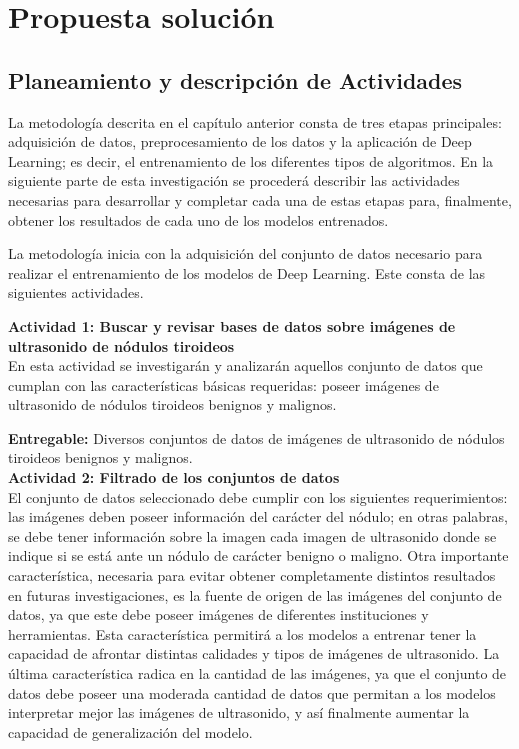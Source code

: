 \section{Propuesta solución}

\subsection{Planeamiento y descripción de Actividades}

La metodología descrita en el capítulo anterior consta de tres etapas principales: adquisición de datos, preprocesamiento de los datos y la aplicación de Deep Learning; es decir, el entrenamiento de los diferentes tipos de algoritmos. En la siguiente parte de esta investigación se procederá describir las actividades necesarias para desarrollar y completar cada una de estas etapas para, finalmente, obtener los resultados de cada uno de los modelos entrenados.

La metodología inicia con la adquisición del conjunto de datos necesario para realizar el entrenamiento de los modelos de Deep Learning. Este consta de las siguientes actividades.

\textbf{Actividad 1: Buscar y revisar bases de datos sobre imágenes de ultrasonido de nódulos tiroideos}
\\
En esta actividad se investigarán y analizarán aquellos conjunto de datos que cumplan con las características básicas requeridas: poseer imágenes de ultrasonido de nódulos tiroideos benignos y malignos.

\textbf{Entregable:} Diversos conjuntos de datos de imágenes de ultrasonido de nódulos tiroideos benignos y malignos.
\\

\textbf{Actividad 2: Filtrado de los conjuntos de datos}
\\
El conjunto de datos seleccionado debe cumplir con los siguientes requerimientos: las imágenes deben poseer información del carácter del nódulo; en otras palabras, se debe tener información sobre la imagen cada imagen de ultrasonido donde se indique si se está ante un nódulo de carácter benigno o maligno. Otra importante característica, necesaria para evitar obtener completamente distintos resultados en futuras investigaciones, es la fuente de origen de las imágenes del conjunto de datos, ya que este debe poseer imágenes de diferentes instituciones y herramientas. Esta característica permitirá a los modelos a entrenar tener la capacidad de afrontar distintas calidades y tipos de imágenes de ultrasonido. La última característica radica en la cantidad de las imágenes, ya que el conjunto de datos debe poseer una moderada cantidad de datos que permitan a los modelos interpretar mejor las imágenes de ultrasonido, y así finalmente aumentar la capacidad de generalización del modelo.

